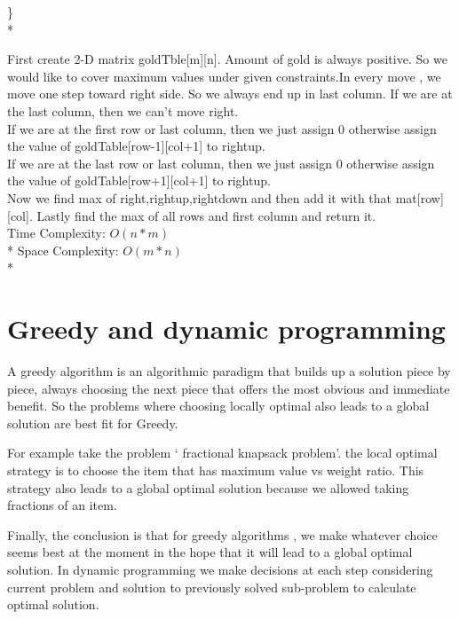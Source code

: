 \documentclass[12pt]{book}
\begin{document}
\} \\* 

First create 2-D matrix goldTble[m][n]. Amount of gold is always positive. So we would like to cover maximum values under given constraints.In every move , we move one step toward right side. So we always end up in last column. If we are at the last column, then we can’t move right.\\
\newline
If we are at the first row or last column, then we just assign 0 otherwise assign the value of goldTable[row-1][col+1] to rightup. \\
\newline
If we are at the last row or last column, then we just assign 0 otherwise assign the value of goldTable[row+1][col+1] to rightup. \\
\newline
Now we find max of right,rightup,rightdown and then add it with that mat[row][col].
Lastly find the max of all rows and first column and return it. \\
\newline
\newline
Time Complexity:
$O(n*m)$ \\*
Space Complexity:
$O(m*n)$ \\*
\newline
\newline
\chapter{Greedy and dynamic programming}
A greedy algorithm is an algorithmic paradigm that builds up a solution piece by piece, always choosing the next piece that offers the most obvious and immediate benefit. So the problems where choosing locally optimal also leads to a global solution are best fit for Greedy. \\
\newline

For example take the problem ‘ fractional knapsack problem'. the local optimal strategy is to choose the item that has maximum value vs  weight ratio. This strategy also leads to a global optimal solution because we allowed taking fractions of an item.\\
\newline

Finally, the conclusion is that for greedy algorithms , we make whatever choice seems best at the moment in the hope that it will lead to a global optimal solution. In dynamic programming we make decisions at each step considering current problem and  solution to previously solved sub-problem to calculate optimal solution.\\
\newline
\end{document}
